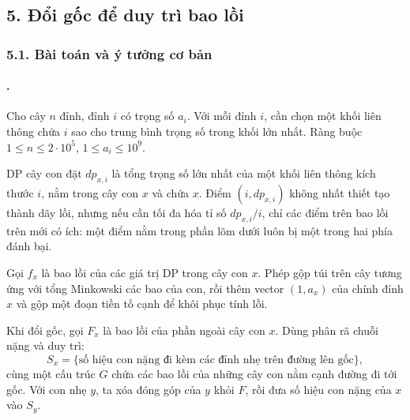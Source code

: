 \documentclass[11pt]{article}
\begin{document}
\subsection*{5. Đổi gốc để duy trì bao lồi}

\subsubsection*{5.1. Bài toán và ý tưởng cơ bản}

\paragraph{.}
Cho cây \(n\) đỉnh, đỉnh \(i\) có trọng số \(a_i\). Với mỗi đỉnh \(i\), cần
chọn một khối liên thông chứa \(i\) sao cho trung bình trọng số trong khối lớn
nhất. Ràng buộc \(1\le n\le 2\cdot 10^5\), \(1\le a_i\le 10^9\).

DP cây con đặt \(dp_{x,i}\) là tổng trọng số lớn nhất của một khối liên thông
kích thước \(i\), nằm trong cây con \(x\) và chứa \(x\). Điểm
\((i,dp_{x,i})\) không nhất thiết tạo thành dãy lồi, nhưng nếu cần tối đa hóa
tỉ số \(dp_{x,i}/i\), chỉ các điểm trên bao lồi trên mới có ích: một điểm nằm
trong phần lõm dưới luôn bị một trong hai phía đánh bại.

Gọi \(f_x\) là bao lồi của các giá trị DP trong cây con \(x\). Phép gộp túi
trên cây tương ứng với tổng Minkowski các bao của con, rồi thêm vector
\((1,a_x)\) của chính đỉnh \(x\) và gộp một đoạn tiền tố cạnh để khôi phục tính
lồi.

\begin{center}
\end{center}

Khi đổi gốc, gọi \(F_x\) là bao lồi của phần ngoài cây con \(x\). Dùng phân rã
chuỗi nặng và duy trì:
\[
  S_x=\{\text{số hiệu con nặng đi kèm các đỉnh nhẹ trên đường lên gốc}\},
\]
cùng một cấu trúc \(G\) chứa các bao lồi của những cây con nằm cạnh đường đi
tới gốc. Với con nhẹ \(y\), ta xóa đóng góp của \(y\) khỏi \(F\), rồi đưa số
hiệu con nặng của \(x\) vào \(S_y\).

\begin{center}
\end{center}
\end{document}
